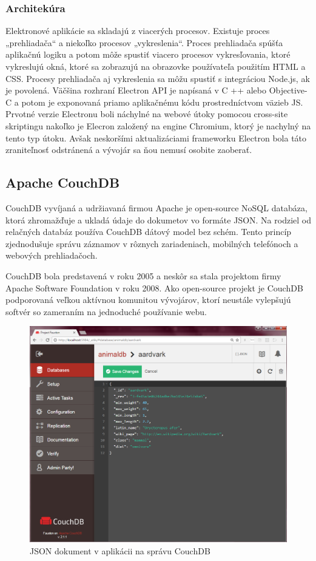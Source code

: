 \subsubsection{Architekúra}
\indent Elektronové aplikácie sa skladajú z viacerých procesov. Existuje proces „prehliadača“ a niekoľko procesov „vykreslenia“. Proces prehliadača spúšťa aplikačnú logiku a potom môže spustiť viacero procesov vykresľovania, ktoré vykreslujú okná, ktoré sa zobrazujú na obrazovke používateľa použitím HTML a CSS. Procesy prehliadača aj vykreslenia sa môžu spustiť s integráciou Node.js, ak je povolená.
\indent Väčšina rozhraní Electron API je napísaná v C ++ alebo Objective-C a potom je exponovaná priamo aplikačnému kódu prostredníctvom väzieb JS. Prvotné verzie Electronu boli náchylné na webové útoky pomocou cross-site skriptingu nakoľko je Elecron založený na engine Chromium, ktorý je nachylný na tento typ útoku. Avšak neskoršími aktualizáciami frameworku Electron bola táto zraniteľnosť odstránená a vývojár sa ňou nemusí osobite zaoberať. 


\subsection{Apache CouchDB}
\indent CouchDB vyvíjaná a udržiavaná firmou Apache je open-source NoSQL databáza, ktorá zhromažďuje a ukladá údaje do dokumetov vo formáte JSON. Na rodziel od relačných databáz používa CouchDB dátový model bez schém. Tento princíp zjednodušuje správu záznamov v rôznych zariadeniach, mobilných telefónoch a webových prehliadačoch.

\indent CouchDB bola predstavená v roku 2005 a neskôr sa stala projektom firmy Apache Software Foundation v roku 2008. Ako open-source projekt je CouchDB podporovaná veľkou aktívnou komunitou vývojárov, ktorí neustále vylepšujú softvér so zameraním na jednoduché používanie webu.

\begin{figure}[H]
    \centering
    \includegraphics[scale=0.30]{img/coucdb.png}
    \caption{JSON dokument v aplikácii na správu CouchDB}
    \label{fig:couch_db}
\end{figure}

